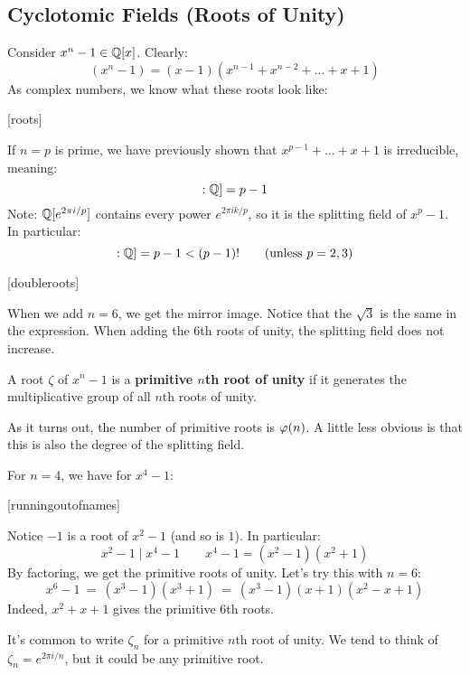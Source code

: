 \subsection{Cyclotomic Fields (Roots of Unity)}
Consider $ x^{n}-1 \in \mathbb{Q}[x] $. Clearly:
\begin{equation*}
    (x^{n}-1) = (x-1)(x^{n-1}+x^{n-2}+\dots+x+1)
\end{equation*}
As complex numbers, we know what these roots look like:

[roots]

If $ n = p $ is prime, we have previously shown that $ x^{p-1}+\dots+x+1 $ is
irreducible, meaning:
\begin{equation*}
    [\bQ[e^{2\pi i/p}]:\bQ] = p-1
\end{equation*}
Note: $ \mathbb{Q}[e^{2\pi i/p}] $ contains every power $ e^{2\pi ik/p} $, so it is
the splitting field of $ x^{p}-1 $. In particular:
\begin{equation*}
    [\bQ[e^{2\pi i/p}]:\bQ] = p-1 < (p-1)! \qquad (\trm{unless }p=2,3)
\end{equation*}

[doubleroots]

When we add $ n=6 $, we get the mirror image. Notice that the $ \sqrt{3} $ is
the same in the expression. When adding the 6th roots of unity, the splitting
field does not increase.

\begin{defn}
    A root $ \zeta $ of $ x^{n}-1 $ is a \textbf{primitive $ n $th root of unity}
    if it generates the multiplicative group of all $ n $th roots of unity.
\end{defn}

As it turns out, the number of primitive roots is $ \operatorname{\varphi}(n) $. A little less
obvious is that this is also the degree of the splitting field.

\begin{xmp}[source=Primary Source Material]
    For $ n=4 $, we have for $ x^{4}-1 $:
    
    [runningoutofnames]

    Notice $ -1 $ is a root of $ x^{2}-1 $ (and so is $ 1 $). In particular:
    \begin{equation*}
        x^{2}-1 \mid x^{4}-1 \qquad x^{4}-1=(x^{2}-1)(x^{2}+1)
    \end{equation*}
    By factoring, we get the primitive roots of unity. \vsp
    Let's try this with $ n=6 $:
    \begin{equation*}
        x^{6}-1 \ = \ (x^{3}-1)(x^{3}+1) \ = \ (x^{3}-1)(x+1)(x^{2}-x+1)
    \end{equation*}
    Indeed, $ x^{2}+x+1 $ gives the primitive 6th roots.
\end{xmp}
It's common to write $ \zeta_{n} $ for a primitive $ n $th root of unity.
We tend to think of $ \zeta_{n} = e^{2\pi i/n} $, but it could be any primitive
root.

